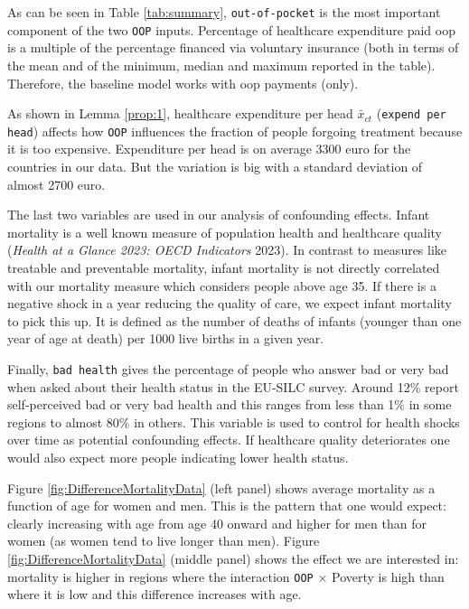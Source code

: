 \documentclass[a4paper,12pt]{article}
\makeatletter
\newcommand{\citeprocitem}[2]{\hyper@linkstart{cite}{citeproc_bib_item_#1}#2\hyper@linkend}
\makeatother
\begin{document}
As can be seen in Table \ref{tab:summary}, \texttt{out-of-pocket} is the most important component of the two \texttt{OOP} inputs. Percentage of healthcare expenditure paid oop is a multiple of the percentage financed via voluntary insurance (both in terms of the mean and of the minimum, median and maximum reported in the table). Therefore, the baseline model works with oop payments (only).

As shown in Lemma \ref{prop:1}, healthcare expenditure per head \(\bar x_{ct}\) (\texttt{expend per head}) affects how \texttt{OOP} influences the fraction of people forgoing treatment because it is too expensive. Expenditure per head is on average 3300 euro for the countries in our data. But the variation is big with a standard deviation of almost 2700 euro.

The last two variables are used in our analysis of confounding effects. Infant mortality is a well known measure of population health and healthcare quality (\citeprocitem{13}{\textit{Health at a Glance 2023: OECD Indicators} 2023}). In contrast to measures like treatable and preventable mortality, infant mortality is not directly correlated with our mortality measure which considers people above age 35. If there is a negative shock in a year reducing the quality of care, we expect infant mortality to pick this up. It is defined as the number of deaths of infants (younger than one year of age at death) per 1000 live births in a given year.

Finally, \texttt{bad health} gives the percentage of people who answer bad or very bad when asked about their health status in the EU-SILC survey. Around 12\% report self-perceived bad or very bad health and this ranges from less than 1\% in some regions to almost 80\% in others. This variable is used to control for health shocks over time as potential confounding effects. If healthcare quality deteriorates one would also expect more people indicating lower health status.


Figure \ref{fig:DifferenceMortalityData} (left panel) shows average mortality as a function of age for women and men. This is the pattern that one would expect: clearly increasing with age from age 40 onward and higher for men than for women (as women tend to live longer than men). Figure \ref{fig:DifferenceMortalityData} (middle panel) shows the effect we are interested in: mortality is higher in regions where the interaction \texttt{OOP} \(\times\) Poverty is high than where it is low and this difference increases with age. 
\end{document}
